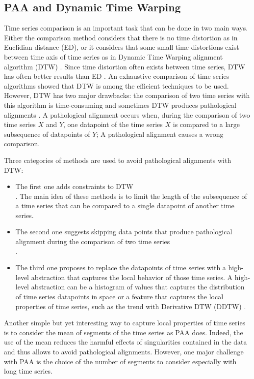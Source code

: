 \subsection{PAA and Dynamic Time Warping}

 Time series comparison is an important task that
can be done in two main ways.
Either the comparison method  considers that there is no time distortion as in Euclidian distance
(ED), or it considers that  some small time distortions  exist between time axis of time series as
in Dynamic Time Warping alignment algorithm (DTW)
\cite{Zhang_Tang_Duan_2015}. Since time distortion often exists between time series, DTW  has often
better results than ED \cite{UCRArchive}. An exhaustive comparison of time series algorithms
\cite{Bagnall} showed that DTW is among the efficient techniques to be used. However, DTW has two major
drawbacks:
 the comparison of two time series with this algorithm is time-consuming
\cite{Rakthanmanon_Campana_Mueen_Batista_Westover_Zhu_Zakaria_Keogh_2012} and sometimes DTW
 produces pathological alignments \cite{Keogh_Pazzani_2001}. A
pathological alignment occurs when, during the comparison of two time  series $X$
and $Y$, one datapoint of the time series $X$ is compared to a large subsequence
of datapoints of $Y$;  A pathological alignment causes a wrong comparison.


 Three categories of methods are used to avoid pathological alignments with DTW:

\begin{itemize}
  \item The first one adds constraints to DTW \cite{Ratanamahatana_Keogh_2004} \cite{Yu_Yu_Hu_Liu_Wu_2011}  \cite{candan2012sdtw}  \cite{sakoe1978dynamic} \\ \cite{jeong2011weighted}  \cite{salvador2007toward}.
  The main idea of these methods is to limit the length of the subsequence of a time series
  that can be compared to a single datapoint of another time series.
  
  \item The second one suggests skipping data points that
  produce pathological alignment during the comparison of two time series \cite{longin2005elastic} \\ \cite{itakura1975minimum}  \cite{myers1980performance}.
  \item The third one proposes to replace the datapoints of time
  series with a high-level abstraction that captures the local behavior of those
  time series. A high-level abstraction can be a histogram of values that
  captures the distribution of time series datapoints in space \cite{Zhang_Tang_Duan_2015} or a 
  feature that captures the local  properties of time series, such as the trend with Derivative DTW
  (DDTW) \cite{Keogh_Pazzani_2001}.
\end{itemize}
Another simple but yet interesting way to capture local properties of time series is to  consider the mean of segments of the time series as PAA does. Indeed, the use of the mean reduces the harmful effects of singularities contained in the data and thus allows to avoid pathological
alignments.  However, one major challenge with PAA is the choice of the number of segments to
consider especially with long time series.


